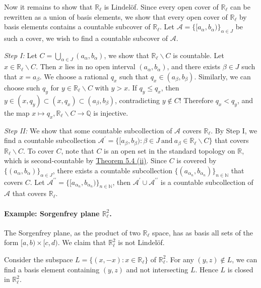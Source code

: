 \documentclass{article}
\numberwithin{equation}{section}
\theoremstyle{plain}
\theoremstyle{definition}
\begin{document}
Now it remains to show that $\mathbb{R}_\ell$ is Lindelöf. Since every open cover of $\mathbb{R}_\ell$ can be rewritten as a union of basis elements, we show that every open cover of $\mathbb{R}_\ell$ by basis elements contains a countable subcover of $\mathbb{R}_\ell$. Let $\mathscr{A}=\{[a_\alpha,b_\alpha)\}_{\alpha\in J}$ be such a cover, we wish to find a countable subcover of $\mathscr{A}$.

\textit{Step I:} Let $C=\bigcup_{\alpha\in J}(a_\alpha,b_\alpha)$, we show that $\mathbb{R}_\ell\backslash C$ is countable. Let $x\in\mathbb{R}_\ell\backslash C$. Then $x$ lies in no open interval $(a_\alpha,b_\alpha)$, and there exists $\beta\in J$ such that $x=a_\beta$. We choose a rational $q_x$ such that $q_x\in(a_\beta,b_\beta)$. Similarly, we can choose such $q_y$ for $y\in\mathbb{R}_\ell\backslash C$ with $y > x$. If $q_y\leq q_x$, then $y\in (x,q_y)\subset (x,q_x) \subset (a_\beta,b_\beta)$, contradicting $y\notin C$! Therefore $q_x < q_y$, and the map $x\mapsto q_x,\mathbb{R}_\ell\backslash C\to\mathbb{Q}$ is injective.

\textit{Step II:} We show that some countable subcollection of $\mathscr{A}$ covers $\mathbb{R}_\ell$. By Step I, we find a countable subcollection $\mathscr{A}^\prime=\{[a_\beta,b_\beta):\beta\in J\ \text{and}\ a_\beta\in\mathbb{R}_\ell\backslash C\}$ that covers $\mathbb{R}_\ell\backslash C$. To cover $C$, note that $C$ is an open set in the standard topology on $\mathbb{R}$, which is second-countable by \hyperref[thm:5.4]{Theorem 5.4 (ii)}. Since $C$ is covered by $\{(a_\alpha,b_\alpha)\}_{\alpha\in J}$, there exists a countable subcollection $\{(a_{\alpha_n},b_{\alpha_n})\}_{n\in\mathbb{N}}$ that covers $C$. Let $\mathscr{A}^{\prime\prime}=\{[a_{\alpha_n},b_{\alpha_n})\}_{n\in\mathbb{N}}$, then $\mathscr{A}^{\prime}\cup\mathscr{A}^{\prime\prime}$ is a countable subcollection of $\mathscr{A}$ that covers $\mathbb{R}_\ell$.

\paragraph{Example: Sorgenfrey plane $\mathbb{R}_\ell^2$.} The Sorgenfrey plane, as the product of two $\mathbb{R}_\ell$ space, has as basis all sets of the form $[a,b)\times[c,d)$. We claim that $\mathbb{R}_\ell^2$ is not Lindelöf.

Consider the subspace $L=\{(x,-x):x\in\mathbb{R}_\ell\}$ of $\mathbb{R}_\ell^2$. For any $(y,z)\notin L$, we can find a basis element containing $(y,z)$ and not intersecting $L$. Hence $L$ is closed in $\mathbb{R}_\ell^2$.
\end{document}
